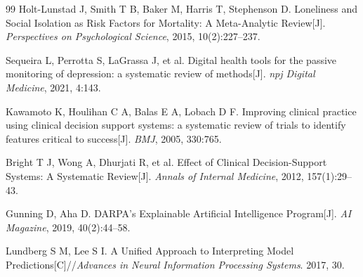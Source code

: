 \documentclass[UTF8,a4paper,zihao=-4,fontset=fandol]{ctexart}
\begin{document}
\begin{thebibliography}{99}
Holt-Lunstad J, Smith T B, Baker M, Harris T, Stephenson D. Loneliness and Social Isolation as Risk Factors for Mortality: A Meta-Analytic Review[J]. \textit{Perspectives on Psychological Science}, 2015, 10(2):227--237.

Sequeira L, Perrotta S, LaGrassa J, et al. Digital health tools for the passive monitoring of depression: a systematic review of methods[J]. \textit{npj Digital Medicine}, 2021, 4:143.

Kawamoto K, Houlihan C A, Balas E A, Lobach D F. Improving clinical practice using clinical decision support systems: a systematic review of trials to identify features critical to success[J]. \textit{BMJ}, 2005, 330:765.

Bright T J, Wong A, Dhurjati R, et al. Effect of Clinical Decision-Support Systems: A Systematic Review[J]. \textit{Annals of Internal Medicine}, 2012, 157(1):29--43.

Gunning D, Aha D. DARPA's Explainable Artificial Intelligence Program[J]. \textit{AI Magazine}, 2019, 40(2):44--58.

Lundberg S M, Lee S I. A Unified Approach to Interpreting Model Predictions[C]//\textit{Advances in Neural Information Processing Systems}. 2017, 30.

\end{thebibliography}
\end{document}

